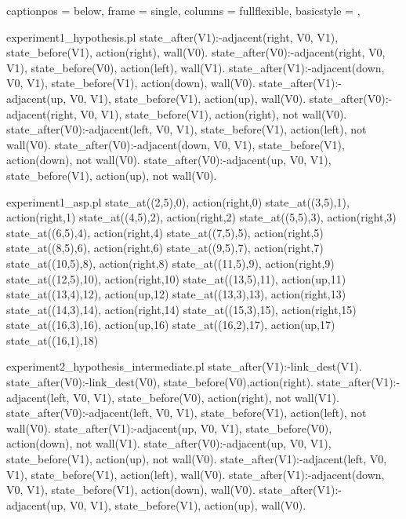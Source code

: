 \lstset
{
  captionpos = below,
  frame      = single,
  columns    = fullflexible,
  basicstyle = \ttfamily,
}

\begin{filecontents*}{experiment1_hypothesis.pl}
state_after(V1):-adjacent(right, V0, V1), state_before(V1), 
                   action(right), wall(V0).
state_after(V0):-adjacent(right, V0, V1), state_before(V0), 
                   action(left), wall(V1).
state_after(V1):-adjacent(down, V0, V1), state_before(V1), 
                   action(down), wall(V0).
state_after(V1):-adjacent(up, V0, V1), state_before(V1), 
                   action(up), wall(V0).
state_after(V0):-adjacent(right, V0, V1), state_before(V1), 
                   action(right), not wall(V0).
state_after(V0):-adjacent(left, V0, V1), state_before(V1), 
                   action(left), not wall(V0).
state_after(V0):-adjacent(down, V0, V1), state_before(V1), 
                   action(down), not wall(V0).
state_after(V0):-adjacent(up, V0, V1), state_before(V1), 
                   action(up), not wall(V0).
\end{filecontents*}

\begin{filecontents*}{experiment1_asp.pl}
state_at((2,5),0), action(right,0)
state_at((3,5),1), action(right,1)
state_at((4,5),2), action(right,2)
state_at((5,5),3), action(right,3)
state_at((6,5),4), action(right,4)
state_at((7,5),5), action(right,5)
state_at((8,5),6), action(right,6)
state_at((9,5),7), action(right,7)
state_at((10,5),8), action(right,8)
state_at((11,5),9), action(right,9)
state_at((12,5),10), action(right,10)
state_at((13,5),11), action(up,11)
state_at((13,4),12), action(up,12)
state_at((13,3),13), action(right,13)
state_at((14,3),14), action(right,14)
state_at((15,3),15), action(right,15)
state_at((16,3),16), action(up,16)
state_at((16,2),17), action(up,17)
state_at((16,1),18)
\end{filecontents*}

\begin{filecontents*}{experiment2_hypothesis_intermediate.pl}
state_after(V1):-link_dest(V1).
state_after(V0):-link_dest(V0), state_before(V0),action(right).
state_after(V1):-adjacent(left, V0, V1), state_before(V0), 
                 action(right), not wall(V1).
state_after(V0):-adjacent(left, V0, V1), state_before(V1), 
                 action(left), not wall(V0).
state_after(V1):-adjacent(up, V0, V1), state_before(V0), 
                 action(down), not wall(V1).
state_after(V0):-adjacent(up, V0, V1), state_before(V1), 
                 action(up), not wall(V0).
state_after(V1):-adjacent(left, V0, V1), state_before(V1), 
                 action(left), wall(V0).
state_after(V1):-adjacent(down, V0, V1), state_before(V1), 
                 action(down), wall(V0).
state_after(V1):-adjacent(up, V0, V1), state_before(V1), 
                 action(up), wall(V0).
\end{filecontents*}

